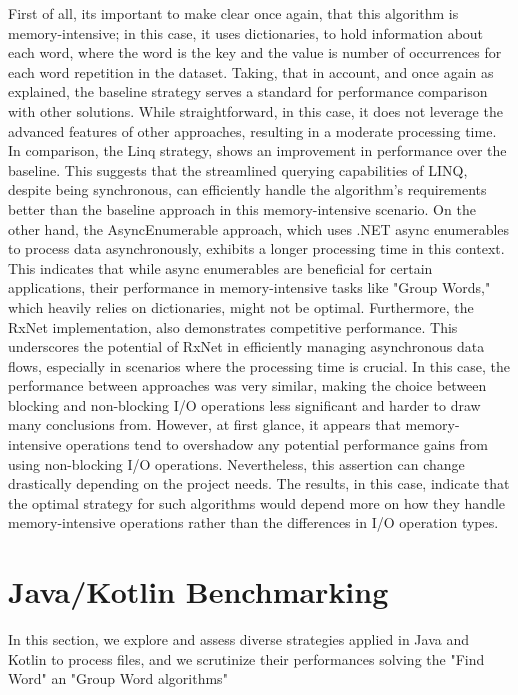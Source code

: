 First of all, its important to make clear once again, that this algorithm is memory-intensive; in this case, it uses dictionaries, to hold information about each word, where the word is the key and the value is number of occurrences for each word repetition in the dataset.
Taking, that in account, and once again as explained, the baseline strategy serves a standard for performance comparison with other solutions. While straightforward, in this case, it does not leverage the advanced features of other approaches, resulting in a moderate processing time. In comparison, the Linq strategy, shows an improvement in performance over the baseline. This suggests that the streamlined querying capabilities of LINQ, despite being synchronous, can efficiently handle the algorithm's requirements better than the baseline approach in this memory-intensive scenario.
On the other hand, the AsyncEnumerable approach, which uses .NET async enumerables to process data asynchronously, exhibits a longer processing time in this context. This indicates that while async enumerables are beneficial for certain applications, their performance in memory-intensive tasks like "Group Words," which heavily relies on dictionaries, might not be optimal.
Furthermore, the RxNet implementation, also demonstrates competitive performance. This underscores the potential of RxNet in efficiently managing asynchronous data flows, especially in scenarios where the processing time is crucial.
In this case, the performance between approaches was very similar, making the choice between blocking and non-blocking I/O operations less significant and harder to draw many conclusions from. However, at first glance, it appears that memory-intensive operations tend to overshadow any potential performance gains from using non-blocking I/O operations. Nevertheless, this assertion can change drastically depending on the project needs.
The results, in this case, indicate that the optimal strategy for such algorithms would depend more on how they handle memory-intensive operations rather than the differences in I/O operation types.

\section{Java/Kotlin Benchmarking}
\label{sec:java_implementation}
In this section, we explore and assess diverse strategies applied in Java and Kotlin to process files, and we scrutinize their performances solving the "Find Word" an "Group Word algorithms"

